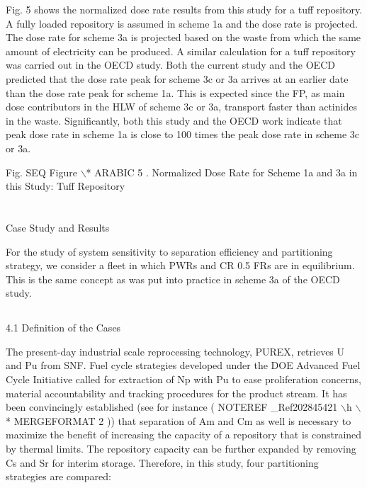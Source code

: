 	Fig. 5 shows the normalized dose rate results from this study for a
tuff repository. A fully loaded repository is assumed in scheme 1a and
the dose rate is projected. The dose rate for scheme 3a is projected
based on the waste from which the same amount of electricity can be
produced.  A similar calculation for a tuff repository was carried out
in the OECD study.  Both the current study and the OECD predicted that
the dose rate peak for scheme 3c or 3a arrives at an earlier date than
the dose rate peak for scheme 1a.  This is expected since the FP, as
main dose contributors in the HLW of scheme 3c or 3a, transport faster
than actinides in the waste.   Significantly, both this study and the
OECD work indicate that peak dose rate in scheme 1a is close to 100
times the peak dose rate in scheme 3c or 3a.

Fig.   SEQ Figure $\backslash$* ARABIC  5 .  Normalized Dose Rate for
Scheme 1a and 3a in this Study: Tuff Repository



\section{}
\label{ses_sec:}
Case Study and Results

	For the study of system sensitivity to separation efficiency and
partitioning strategy, we consider a fleet in which PWRs and CR 0.5 FRs
are in equilibrium.  This is the same concept as was put into practice
in scheme 3a of the OECD study.


\subsection{}
\label{ses_sec:}
4.1 Definition of the Cases

	The present-day industrial scale reprocessing technology, PUREX,
retrieves U and Pu from SNF. Fuel cycle strategies developed under the
DOE Advanced Fuel Cycle Initiative called for extraction of Np with Pu
to ease proliferation concerns, material accountability and tracking
procedures for the product stream. It has been convincingly established
(see for instance (  NOTEREF \_Ref202845421 $\backslash$h  $\backslash$*
MERGEFORMAT  2 )) that separation of Am and Cm as well is necessary to
maximize the benefit of increasing the capacity of a repository that is
constrained by thermal limits.  The repository capacity can be further
expanded by removing Cs and Sr for interim storage. Therefore, in this
study, four partitioning strategies are compared:

